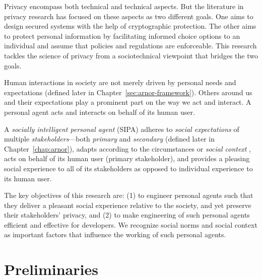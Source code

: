 \documentclass[11pt,          %
               phd,           %
               onehalfspacing %
               ]{ncsuthesis}
\begin{document}
Privacy encompass both technical and technical aspects. But the
literature in privacy research has focused on these aspects as two
different goals.  One aims to design secured systems with the help of
cryptographic protection. The other aims to protect personal information
by facilitating informed choice options to an individual and assume that
policies and regulations are enforceable. This research tackles
the science of privacy from a sociotechnical viewpoint that bridges the 
two goals.

Human interactions in society are not merely driven by personal needs
and expectations (defined later in Chapter~\ref{sec:arnor-framework}). 
Others around us and their expectations play a
prominent part on the way we act and interact. A personal agent acts and
interacts on behalf of its human user. 

A \emph{socially intelligent personal agent} (SIPA) adheres to
\emph{social expectations} of multiple \emph{stakeholders}---both
\emph{primary} and \emph{secondary} (defined later in
Chapter~\ref{chap:arnor}), adapts according to the circumstances or
\emph{social context} \citep{Dey-2001-Context}, acts on behalf of its
human user (primary stakeholder), and provides a pleasing social
experience to all of its stakeholders as opposed to individual
experience to its human user.


The key objectives of this research are: (1) to engineer personal agents
such that they deliver a pleasant social experience relative to the
society, and yet preserve their stakeholders' privacy, and (2) to make
engineering of such personal agents efficient and effective for
developers. We recognize social norms and social context as important
factors that influence the working of such personal agents.



\section{Preliminaries}
\end{document}
